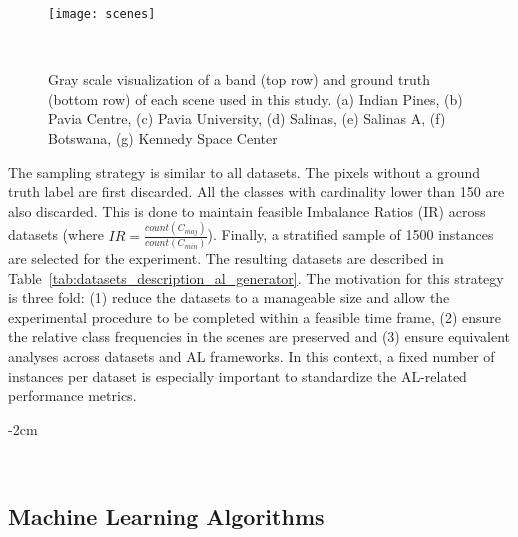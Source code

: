 \begin{figure}
	\centering
	\texttt{[image: scenes]}
    \caption[Gray scale visualization of a band and ground truth of each scene
        used in this study.]{%
        Gray scale visualization of a band (top row) and ground truth (bottom
        row) of each scene used in this study. (a) Indian Pines, (b) Pavia
        Centre, (c) Pavia University, (d) Salinas, (e) Salinas A, (f)
        Botswana, (g) Kennedy Space Center 
    }~\label{fig:scenes}
\end{figure}

The sampling strategy is similar to all datasets. The pixels without a ground
truth label are first discarded. All the classes with cardinality lower than
150 are also discarded. This is done to maintain feasible Imbalance Ratios (IR)
across datasets (where $IR = \frac{count(C_{maj})}{count(C_{min})}$). Finally,
a stratified sample of 1500 instances are selected for the experiment. The
resulting datasets are described in
Table~\ref{tab:datasets_description_al_generator}. The
motivation for this strategy is three fold: (1) reduce the datasets to a
manageable size and allow the experimental procedure to be completed within a
feasible time frame, (2) ensure the relative class frequencies in the scenes
are preserved and (3) ensure equivalent analyses across datasets and AL
frameworks. In this context, a fixed number of instances per dataset is
especially important to standardize the AL-related performance metrics.

\begin{table}
    \centering
    \addtolength{\leftskip} {-2cm}
    \addtolength{\rightskip}{-2cm}
    \caption[Description of the datasets collected from each corresponding
        scene.]{%
        Description of the datasets collected from each corresponding scene.
        The sampling strategy is similar to all scenes.
    }~\label{tab:datasets_description_al_generator}
\end{table}

\subsection{Machine Learning Algorithms}~\label{sec:machine_learning_algorithms-al-generator}

